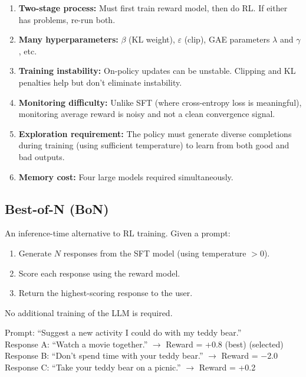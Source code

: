 \documentclass[11pt, a4paper]{article}
\begin{document}
\begin{warnbox}
\begin{enumerate}[leftmargin=1.5em]
  \item \textbf{Two-stage process:} Must first train reward model, then do RL. If either has problems, re-run both.
  \item \textbf{Many hyperparameters:} $\beta$ (KL weight), $\varepsilon$ (clip), GAE parameters $\lambda$ and $\gamma$, etc.
  \item \textbf{Training instability:} On-policy updates can be unstable. Clipping and KL penalties help but don't eliminate instability.
  \item \textbf{Monitoring difficulty:} Unlike SFT (where cross-entropy loss is meaningful), monitoring average reward is noisy and not a clean convergence signal.
  \item \textbf{Exploration requirement:} The policy must generate diverse completions during training (using sufficient temperature) to learn from both good and bad outputs.
  \item \textbf{Memory cost:} Four large models required simultaneously.
\end{enumerate}
\end{warnbox}

\subsection{Best-of-N (BoN)}

\begin{defbox}
An inference-time alternative to RL training. Given a prompt:
\begin{enumerate}[leftmargin=1.5em]
  \item Generate $N$ responses from the SFT model (using temperature $> 0$).
  \item Score each response using the reward model.
  \item Return the highest-scoring response to the user.
\end{enumerate}
No additional training of the LLM is required.
\end{defbox}

\begin{exbox}[BoN Example with $N=3$]
Prompt: ``Suggest a new activity I could do with my teddy bear.''\\
Response A: ``Watch a movie together.'' $\to$ Reward = +0.8 (best) (selected)\\
Response B: ``Don't spend time with your teddy bear.'' $\to$ Reward = $-$2.0\\
Response C: ``Take your teddy bear on a picnic.'' $\to$ Reward = +0.2
\end{exbox}
\end{document}

